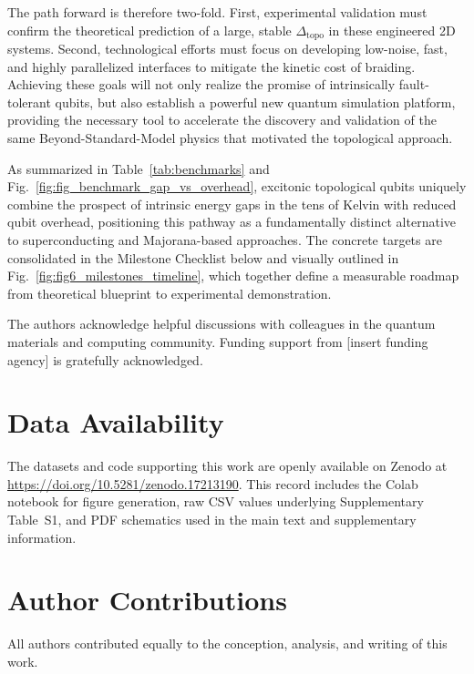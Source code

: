 \documentclass[aps,prl,twocolumn,superscriptaddress]{revtex4-2}
\begin{document}
The path forward is therefore two-fold. First, experimental validation must confirm the theoretical prediction of a large, stable $\Delta_{\text{topo}}$ in these engineered 2D systems. Second, technological efforts must focus on developing low-noise, fast, and highly parallelized interfaces to mitigate the kinetic cost of braiding. Achieving these goals will not only realize the promise of intrinsically fault-tolerant qubits, but also establish a powerful new quantum simulation platform, providing the necessary tool to accelerate the discovery and validation of the same Beyond-Standard-Model physics that motivated the topological approach. 

As summarized in Table~\ref{tab:benchmarks} and Fig.~\ref{fig:fig_benchmark_gap_vs_overhead}, excitonic topological qubits uniquely combine the prospect of intrinsic energy gaps in the tens of Kelvin with reduced qubit overhead, positioning this pathway as a fundamentally distinct alternative to superconducting and Majorana-based approaches. The concrete targets are consolidated in the Milestone Checklist below and visually outlined in Fig.~\ref{fig:fig6_milestones_timeline}, which together define a measurable roadmap from theoretical blueprint to experimental demonstration.


\begin{acknowledgments}
The authors acknowledge helpful discussions with colleagues in the quantum materials and computing community. 
Funding support from [insert funding agency] is gratefully acknowledged.
\end{acknowledgments}

\section*{Data Availability}
The datasets and code supporting this work are openly available on Zenodo at \url{https://doi.org/10.5281/zenodo.17213190}. 
This record includes the Colab notebook for figure generation, raw CSV values underlying Supplementary Table~S1, and PDF schematics used in the main text and supplementary information.

\section*{Author Contributions}
All authors contributed equally to the conception, analysis, and writing of this work.
\end{document}
